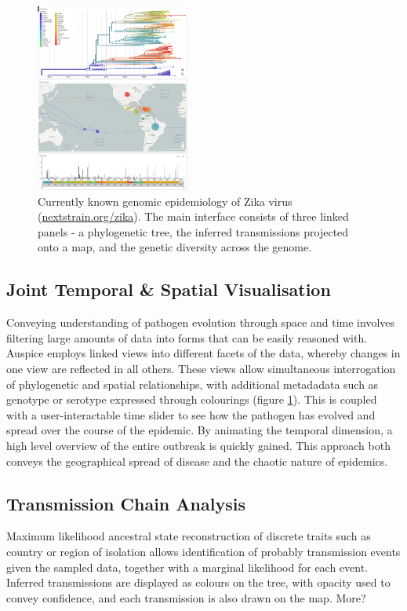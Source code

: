 \documentclass{bioinfo}
\begin{document}
\begin{figure}[!tpb]
\centerline{\includegraphics[width=0.45\textwidth]{figures/nextstrain}}
\caption{Currently known genomic epidemiology of Zika virus (\href{nextstrain.org/zika}{nextstrain.org/zika}). The main interface consists of three linked panels - a phylogenetic tree, the inferred transmissions projected onto a map, and the genetic diversity across the genome.}
\label{nextstrain}
\end{figure}

\subsection*{Joint Temporal \& Spatial Visualisation}
Conveying understanding of pathogen evolution through space and time involves filtering large amounts of data into forms that can be easily reasoned with.
Auspice employs linked views into different facets of the data, whereby changes in one view are reflected in all others.
These views allow simultaneous interrogation of phylogenetic and spatial relationships, with additional metadadata such as genotype or serotype expressed through colourings (figure \ref{nextstrain}).
This is coupled with a user-interactable time slider to see how the pathogen has evolved and spread over the course of the epidemic.
By animating the temporal dimension, a high level overview of the entire outbreak is quickly gained.
This approach both conveys the geographical spread of disease and the chaotic nature of epidemics.


\subsection*{Transmission Chain Analysis}
Maximum likelihood ancestral state reconstruction of discrete traits such as country or region of isolation allows identification of probably transmission events given the sampled data, together with a marginal likelihood for each event.
Inferred transmissions are displayed as colours on the tree, with opacity used to convey confidence, and each transmission is also drawn on the map.
More?
\end{document}

